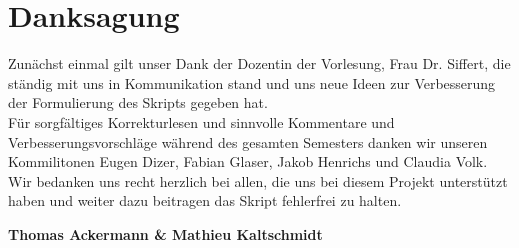 \chapter*{Danksagung}
Zunächst einmal gilt unser Dank der Dozentin der Vorlesung, Frau Dr. Siffert, die ständig mit uns in Kommunikation stand und uns neue Ideen zur Verbesserung der Formulierung des Skripts gegeben hat. \\
Für sorgfältiges Korrekturlesen und sinnvolle Kommentare und Verbesserungsvorschläge während des gesamten Semesters danken wir unseren Kommilitonen Eugen Dizer, Fabian Glaser, Jakob Henrichs und Claudia Volk.\\
Wir bedanken uns recht herzlich bei allen, die uns bei diesem Projekt unterstützt haben und weiter dazu beitragen das Skript fehlerfrei zu halten. \\
\begin{center}
\textbf{Thomas Ackermann \& Mathieu Kaltschmidt}	
\end{center}

\blankpage
